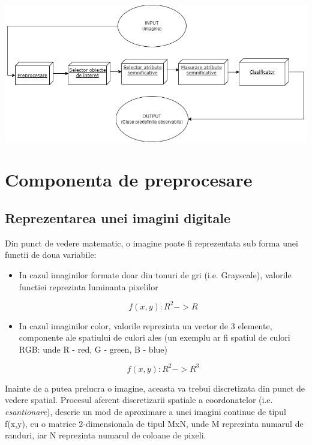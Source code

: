 \documentclass[10pt]{article}
\begin{document}
\includegraphics[scale=0.5]{componente}


\newpage

\section{Componenta de preprocesare}\label{sec:3}

\subsection{Reprezentarea unei imagini digitale}

\> Din punct de vedere matematic, o imagine poate fi reprezentata sub forma unei
functii de doua variabile:

\begin{itemize}
	\item In cazul imaginilor formate doar din tonuri de gri (i.e. Grayscale),
	valorile functiei reprezinta luminanta pixelilor
	
	\begin{equation}\label{eq:1}
		f(x,y) : R^2 -> R
	\end{equation}

	\item In cazul imaginilor color, valorile reprezinta un vector de 3 elemente,
componente ale spatiului de culori ales (un exemplu ar fi spatiul de culori RGB:
unde R - red, G - green, B - blue)

	\begin{equation}\label{eq:2}
		f(x,y) : R^2 -> R^3
	\end{equation}

\end{itemize}


\> Inainte de a putea prelucra o imagine, aceasta va trebui discretizata din punct
de vedere spatial. Procesul aferent discretizarii spatiale a
coordonatelor (i.e. {\it esantionare}), descrie un mod de aproximare a unei imagini continue
de tipul f(x,y), cu o matrice 2-dimensionala de tipul MxN, unde M reprezinta numarul de randuri,
iar N reprezinta numarul de coloane de pixeli.
\end{document}
